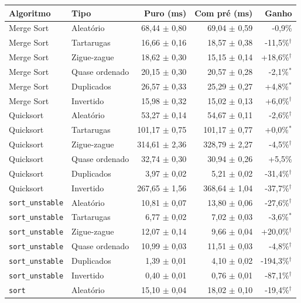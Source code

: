 \small
\begin{tabular}{llrrr}
\hline
\textbf{Algoritmo} & \textbf{Tipo} & \textbf{Puro (ms)} & \textbf{Com pré (ms)} & \textbf{Ganho} \\
\hline
Merge Sort & Aleatório & 68,44 $\pm$ 0,80 & 69,04 $\pm$ 0,59 & -0,9\% \\
Merge Sort & Tartarugas & 16,66 $\pm$ 0,16 & 18,57 $\pm$ 0,38 & -11,5\%$^{\dagger}$ \\
Merge Sort & Zigue-zague & 18,62 $\pm$ 0,30 & 15,15 $\pm$ 0,14 & +18,6\%$^{\dagger}$ \\
Merge Sort & Quase ordenado & 20,15 $\pm$ 0,30 & 20,57 $\pm$ 0,28 & -2,1\%$^{*}$ \\
Merge Sort & Duplicados & 26,57 $\pm$ 0,33 & 25,29 $\pm$ 0,27 & +4,8\%$^{*}$ \\
Merge Sort & Invertido & 15,98 $\pm$ 0,32 & 15,02 $\pm$ 0,13 & +6,0\%$^{\dagger}$ \\
Quicksort & Aleatório & 53,27 $\pm$ 0,14 & 54,67 $\pm$ 0,11 & -2,6\%$^{\dagger}$ \\
Quicksort & Tartarugas & 101,17 $\pm$ 0,75 & 101,17 $\pm$ 0,77 & +0,0\%$^{*}$ \\
Quicksort & Zigue-zague & 314,61 $\pm$ 2,36 & 328,79 $\pm$ 2,27 & -4,5\%$^{\dagger}$ \\
Quicksort & Quase ordenado & 32,74 $\pm$ 0,30 & 30,94 $\pm$ 0,26 & +5,5\% \\
Quicksort & Duplicados & 3,97 $\pm$ 0,02 & 5,21 $\pm$ 0,02 & -31,4\%$^{\dagger}$ \\
Quicksort & Invertido & 267,65 $\pm$ 1,56 & 368,64 $\pm$ 1,04 & -37,7\%$^{\dagger}$ \\
\texttt{sort\_unstable} & Aleatório & 10,81 $\pm$ 0,07 & 13,80 $\pm$ 0,06 & -27,6\%$^{\dagger}$ \\
\texttt{sort\_unstable} & Tartarugas & 6,77 $\pm$ 0,02 & 7,02 $\pm$ 0,03 & -3,6\%$^{*}$ \\
\texttt{sort\_unstable} & Zigue-zague & 12,07 $\pm$ 0,14 & 9,66 $\pm$ 0,04 & +20,0\%$^{\dagger}$ \\
\texttt{sort\_unstable} & Quase ordenado & 10,99 $\pm$ 0,03 & 11,51 $\pm$ 0,03 & -4,8\%$^{\dagger}$ \\
\texttt{sort\_unstable} & Duplicados & 1,39 $\pm$ 0,01 & 4,10 $\pm$ 0,02 & -194,3\%$^{\dagger}$ \\
\texttt{sort\_unstable} & Invertido & 0,40 $\pm$ 0,01 & 0,76 $\pm$ 0,01 & -87,1\%$^{\dagger}$ \\
\texttt{sort} & Aleatório & 15,10 $\pm$ 0,04 & 18,02 $\pm$ 0,10 & -19,4\%$^{\dagger}$ \\

\end{tabular}
